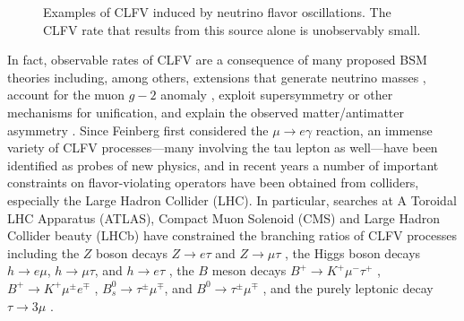 \documentclass[12pt,letterpaper]{book}
\begin{document}
\begin{figure}
\centering
{}
\hspace{5cm}
\caption{Examples of CLFV induced by neutrino flavor oscillations. The CLFV rate that results from this source alone is unobservably small.}
\label{fig:neutrino_clfv}
\end{figure}
 
In fact, observable rates of CLFV are a consequence of many proposed BSM theories including, among others, extensions that generate neutrino masses \cite{PhysRevD.67.076006,Abada:2015oba}, account for the muon $g-2$ anomaly \cite{Lindner:2016bgg,Li:2021lnz}, exploit supersymmetry \cite{Carvalho:2002bq,PhysRevD.74.116002,Figueiredo:2013tea,Gomez:2017dhl} or other mechanisms \cite{Ciafaloni:1995ad,Benbrik:2010cf,Feldmann:2016hvo} for unification, and explain the observed matter/antimatter asymmetry \cite{PhysRevD.83.076007,Merlo:2018rin}. Since Feinberg first considered the $\mu\rightarrow e\gamma$ reaction, an immense variety of CLFV processes---many involving the tau lepton as well---have been identified as probes of new physics, and in recent years a number of important constraints on flavor-violating operators have been obtained from colliders, especially the Large Hadron Collider (LHC). In particular, searches at A Toroidal LHC Apparatus (ATLAS), Compact Muon Solenoid (CMS) and Large Hadron Collider beauty (LHCb) have constrained the branching ratios of CLFV processes including the $Z$ boson decays $Z\rightarrow e\tau$ and $Z\rightarrow \mu\tau$ \cite{ATLAS:2020zlz,ATLAS:2021bdj}, the Higgs boson decays $h\rightarrow e\mu$, $h\rightarrow \mu\tau$, and $h\rightarrow e\tau$ \cite{ATLAS:2016joj,CMS:2017con,CMS:2021rsq}, the $B$ meson decays $B^+\rightarrow K^+\mu^-\tau^+$ \cite{LHCb:2020khb}, $B^+\rightarrow K^+\mu^{\pm}e^{\mp}$ \cite{LHCb:2019bix}, $B_s^{0}\rightarrow \tau^{\pm}\mu^{\mp}$, and $B^0\rightarrow \tau^{\pm}\mu^{\mp}$ \cite{LHCb:2019ujz}, and the purely leptonic decay $\tau\rightarrow 3\mu$ \cite{LHCb:2014kws,ATLAS:2016jts,CMS:2020kwy}. 
\end{document}

